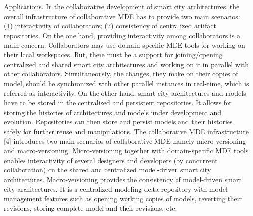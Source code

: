 Applications. In the collaborative development of smart city architectures, the overall infrastructure of collaborative MDE has to provide two main scenarios: (1) interactivity of collaborators; (2) consistency of centralized artifact repositories. On the one hand, providing interactivity among collaborators is a main concern. Collaborators may use domain-specific MDE tools for working on their local workspaces. But, there must be a support for joining/opening centralized and shared smart city architectures and working on it in parallel with other colla­bo­ra­tors. Simultaneously, the changes, they make on their copies of model, should be synchronized with other parallel instances in real-time, which is referred as interactivity. On the other hand, smart city architectures and models have to be stored in the centralized and persistent repositories. It allows for storing the histories of architectures and models under development and evolution. Repositories can then store and persist models and their histories safely for further reuse and manipulations. 
The collaborative MDE infrastructure [4] introduces two main scenarios of collaborative MDE namely micro-versioning and macro-versioning. Micro-versioning together with domain-specific MDE tools enables interactivity of several designers and developers (by concurrent collaboration) on the shared and centralized model-driven smart city architectures. Macro-versioning provides the consistency of model-driven smart city architectures. It is a centralized modeling delta repository with model management features such as opening working copies of models, reverting their revisions, storing complete model and their revisions, etc.